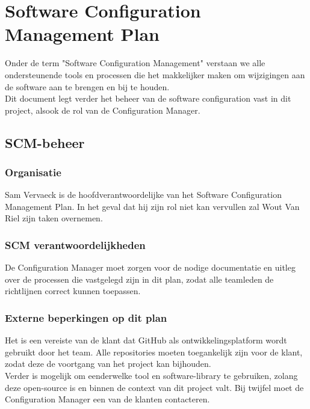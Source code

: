

\section{Software Configuration Management Plan}

Onder de term "Software Configuration Management" verstaan we alle ondersteunende tools en processen die het makkelijker maken om wijzigingen aan de software aan te brengen en bij te houden. \\

Dit document legt verder het beheer van de software configuration vast in dit project, alsook de rol van de Configuration Manager.

\subsection{SCM-beheer}

\subsubsection{Organisatie}

Sam Vervaeck is de hoofdverantwoordelijke van het Software Configuration Management Plan. In het geval dat hij zijn rol niet kan vervullen zal Wout Van Riel zijn taken overnemen. \\

\subsubsection{SCM verantwoordelijkheden}

De Configuration Manager moet zorgen voor de nodige documentatie en uitleg over de processen die vastgelegd zijn in dit plan, zodat alle teamleden de richtlijnen correct kunnen toepassen.

\subsubsection{Externe beperkingen op dit plan}

Het is een vereiste van de klant dat GitHub als ontwikkelingsplatform wordt gebruikt door het team. Alle repositories moeten toegankelijk zijn voor de klant, zodat deze de voortgang van het project kan bijhouden.\\ 

Verder is mogelijk om eenderwelke tool en software-library te gebruiken, zolang deze open-source is en binnen de context van dit project valt. Bij twijfel moet de Configuration Manager een van de klanten contacteren.

